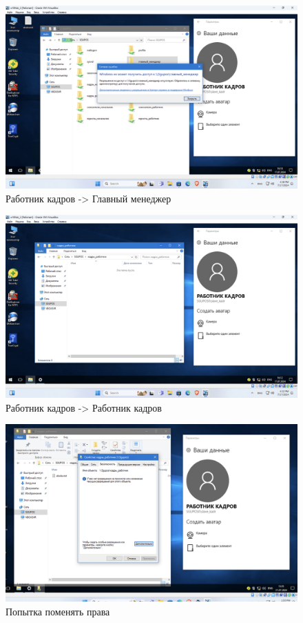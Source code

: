 \begin{figure}[H]
  \centering
  \includegraphics[width=1\textwidth]{pict/prac/31}
  \caption{Работник кадров -> Главный менеджер}
  \label{fig:30}
\end{figure}

\begin{figure}[H]
  \centering
  \includegraphics[width=1\textwidth]{pict/prac/28}
  \caption{Работник кадров -> Работник кадров}
  \label{fig:27}
\end{figure}

\begin{figure}[H]
  \centering
  \includegraphics[width=1\textwidth]{pict/prac/62}
  \caption{Попытка поменять права}
\end{figure}


